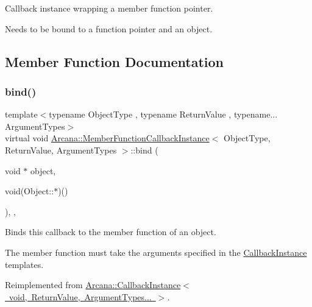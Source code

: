Callback instance wrapping a member function pointer. 

Needs to be bound to a function pointer and an object. 

\subsection{Member Function Documentation}
\mbox{\label{class_arcana_1_1_member_function_callback_instance_ae93ba2e166f268d480431bb7dfd00140}} 
\subsubsection{\texorpdfstring{bind()}{bind()}}
{\footnotesize\ttfamily template$<$typename Object\+Type , typename Return\+Value , typename... Argument\+Types$>$ \\
virtual void \mbox{\hyperlink{class_arcana_1_1_member_function_callback_instance}{Arcana\+::\+Member\+Function\+Callback\+Instance}}$<$ Object\+Type, Return\+Value, Argument\+Types $>$\+::bind (\begin{DoxyParamCaption}\item[{void $\ast$}]{object,  }\item[{void(Object\+::$\ast$)()}]{ }\end{DoxyParamCaption})\hspace{0.3cm}{\ttfamily [inline]}, {\ttfamily [override]}, {\ttfamily [virtual]}}



Binds this callback to the member function of an object. 

The member function must take the arguments specified in the \mbox{\hyperlink{class_arcana_1_1_callback_instance}{Callback\+Instance}} templates. 

Reimplemented from \mbox{\hyperlink{class_arcana_1_1_callback_instance_a55e87e320e0133a4274c60e87a391a7e}{Arcana\+::\+Callback\+Instance$<$ void, Return\+Value, Argument\+Types... $>$}}.

\mbox{\label{class_arcana_1_1_member_function_callback_instance_aa3da0ee51ae4a6465844c7af67da7d83}} 
